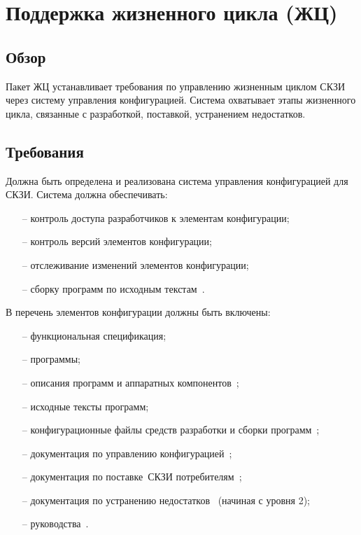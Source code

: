 \section{Поддержка жизненного цикла (ЖЦ)}\label{LC}

\subsection{Обзор}\label{LC.Intro}

Пакет ЖЦ устанавливает требования по управлению жизненным циклом СКЗИ
через систему управления конфигурацией. Система охватывает этапы жизненного 
цикла, связанные с разработкой, поставкой, устранением недостатков.

\subsection{Требования}\label{LC.Reqs}

\label{R.LC.CMSystem} %
Должна быть определена и реализована система управления конфигурацией для СКЗИ.
Система должна обеспечивать:
\begin{itemize}
\item[--]
контроль доступа разработчиков к элементам конфигурации;
\item[--]
контроль версий элементов конфигурации;
\item[--]
отслеживание изменений элементов конфигурации;
\item[--]
сборку программ по исходным текстам~.
\end{itemize}

\label{R.LC.CMList} %
В перечень элементов конфигурации должны быть включены:
\begin{itemize}
\item[--]
функциональная спецификация;
\item[--]
программы;
\item[--]
описания программ и аппаратных компонентов~;
\item[--]
исходные тексты программ;
\item[--]
конфигурационные файлы средств разработки и сборки 
программ~;
\item[--]
документация по управлению конфигурацией~;
\item[--]
документация по поставке~СКЗИ потребителям~;
\item[--]
документация по устранению недостатков~
(начиная с уровня 2);
\item[--]
руководства~.
\end{itemize}

